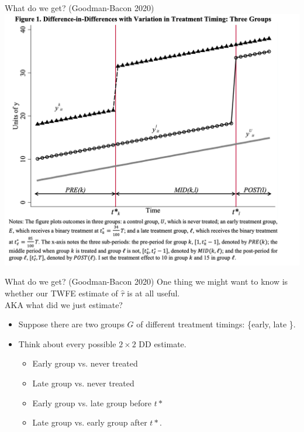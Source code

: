 \documentclass[xcolor=pdftex,dvipsnames,table,mathserif,aspectratio=169]{beamer}
\begin{document}
\begin{frame}{What do we get? (Goodman-Bacon 2020)}
\centering
\includegraphics[height=0.9\textheight]{resources/gb_fig1.png}
\end{frame}


\begin{frame}{What do we get? (Goodman-Bacon 2020)}
One thing we might want to know is whether our TWFE estimate of $\widehat{\tau}$ is at all useful.\\
AKA what did we just estimate?
\begin{itemize}
\item Suppose there are two groups $G$ of different treatment timings: \{early, late \}.
\item Think about every possible $2 \times 2$ DD estimate.
\begin{itemize}
\item Early group vs. never treated
\item Late group vs. never treated
\item Early group vs. late group before $t*$
\item Late group vs. early group after $t*$.
\end{itemize}
\end{itemize}
\end{frame}
\end{document}
